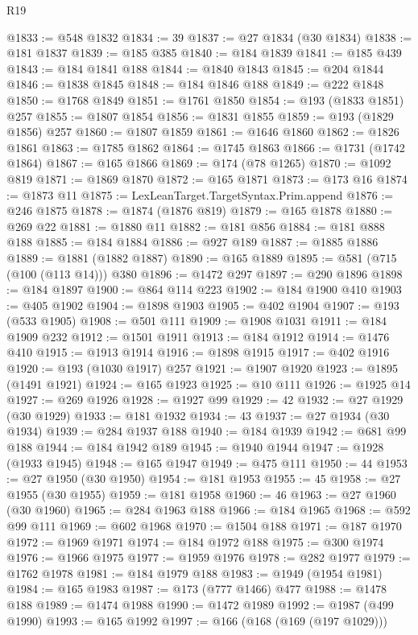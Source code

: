 \begin{lexlean}{R19}
\begin{coremodule}
@1833 := @548 @1832
@1834 := 39
@1837 := @27 @1834 (@30 @1834)
@1838 := @181 @1837
@1839 := @185 @385
@1840 := @184 @1839
@1841 := @185 @439
@1843 := @184 @1841 @188
@1844 := @1840 @1843
@1845 := @204 @1844
@1846 := @1838 @1845
@1848 := @184 @1846 @188
@1849 := @222 @1848
@1850 := @1768 @1849
@1851 := @1761 @1850
@1854 := @193 (@1833 @1851) @257
@1855 := @1807 @1854
@1856 := @1831 @1855
@1859 := @193 (@1829 @1856) @257
@1860 := @1807 @1859
@1861 := @1646 @1860
@1862 := @1826 @1861
@1863 := @1785 @1862
@1864 := @1745 @1863
@1866 := @1731 (@1742 @1864)
@1867 := @165 @1866
@1869 := @174 (@78 @1265)
@1870 := @1092 @819
@1871 := @1869 @1870
@1872 := @165 @1871
@1873 := @173 @16
@1874 := @1873 @11
@1875 := LexLeanTarget.TargetSyntax.Prim.append
@1876 := @246 @1875
@1878 := @1874 (@1876 @819)
@1879 := @165 @1878
@1880 := @269 @22
@1881 := @1880 @11
@1882 := @181 @856
@1884 := @181 @888 @188
@1885 := @184 @1884
@1886 := @927 @189
@1887 := @1885 @1886
@1889 := @1881 (@1882 @1887)
@1890 := @165 @1889
@1895 := @581 (@715 (@100 (@113 @14))) @380
@1896 := @1472 @297
@1897 := @290 @1896
@1898 := @184 @1897
@1900 := @864 @114 @223
@1902 := @184 @1900 @410
@1903 := @405 @1902
@1904 := @1898 @1903
@1905 := @402 @1904
@1907 := @193 (@533 @1905)
@1908 := @501 @111
@1909 := @1908 @1031
@1911 := @184 @1909 @232
@1912 := @1501 @1911
@1913 := @184 @1912
@1914 := @1476 @410
@1915 := @1913 @1914
@1916 := @1898 @1915
@1917 := @402 @1916
@1920 := @193 (@1030 @1917) @257
@1921 := @1907 @1920
@1923 := @1895 (@1491 @1921)
@1924 := @165 @1923
@1925 := @10 @111
@1926 := @1925 @14
@1927 := @269 @1926
@1928 := @1927 @99
@1929 := 42
@1932 := @27 @1929 (@30 @1929)
@1933 := @181 @1932
@1934 := 43
@1937 := @27 @1934 (@30 @1934)
@1939 := @284 @1937 @188
@1940 := @184 @1939
@1942 := @681 @99 @188
@1944 := @184 @1942 @189
@1945 := @1940 @1944
@1947 := @1928 (@1933 @1945)
@1948 := @165 @1947
@1949 := @475 @111
@1950 := 44
@1953 := @27 @1950 (@30 @1950)
@1954 := @181 @1953
@1955 := 45
@1958 := @27 @1955 (@30 @1955)
@1959 := @181 @1958
@1960 := 46
@1963 := @27 @1960 (@30 @1960)
@1965 := @284 @1963 @188
@1966 := @184 @1965
@1968 := @592 @99 @111
@1969 := @602 @1968
@1970 := @1504 @188
@1971 := @187 @1970
@1972 := @1969 @1971
@1974 := @184 @1972 @188
@1975 := @300 @1974
@1976 := @1966 @1975
@1977 := @1959 @1976
@1978 := @282 @1977
@1979 := @1762 @1978
@1981 := @184 @1979 @188
@1983 := @1949 (@1954 @1981)
@1984 := @165 @1983
@1987 := @173 (@777 @1466) @477
@1988 := @1478 @188
@1989 := @1474 @1988
@1990 := @1472 @1989
@1992 := @1987 (@499 @1990)
@1993 := @165 @1992
@1997 := @166 (@168 (@169 (@197 @1029)))

\end{coremodule}
\end{lexlean}
